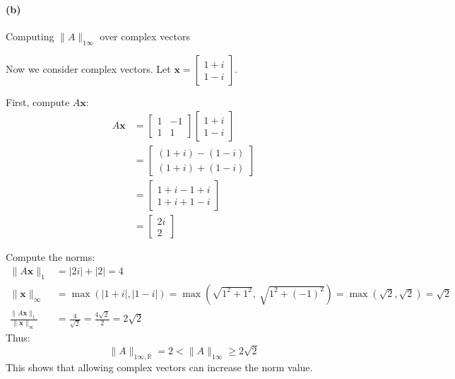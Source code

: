 \paragraph*{(b)} Computing $\|A\|_{1\infty}$ over complex vectors

Now we consider complex vectors. Let $\mathbf{x} = \begin{bmatrix} 1 + i \\ 1 - i \end{bmatrix}$.

First, compute $A\mathbf{x}$:
\begin{align*}
    A\mathbf{x} & = \begin{bmatrix} 1 & -1 \\ 1 & 1 \end{bmatrix} \begin{bmatrix} 1 + i \\ 1 - i \end{bmatrix} \\
                & = \begin{bmatrix} (1 + i) - (1 - i) \\ (1 + i) + (1 - i) \end{bmatrix}                       \\
                & = \begin{bmatrix} 1 + i - 1 + i \\ 1 + i + 1 - i \end{bmatrix}                               \\
                & = \begin{bmatrix} 2i \\ 2 \end{bmatrix}
\end{align*}

Compute the norms:
\begin{align*}
    \|A\mathbf{x}\|_1                               & = |2i| + |2| = 4                                                                                               \\
    \|\mathbf{x}\|_{\infty}                         & = \max(|1 + i|, |1 - i|) = \max(\sqrt{1^2 + 1^2}, \ \sqrt{1^2 + (-1)^2}) = \max(\sqrt{2}, \sqrt{2}) = \sqrt{2} \\
    \frac{\|A\mathbf{x}\|_1}{\|\mathbf{x}\|_\infty} & = \frac{4}{\sqrt{2}} = \frac{4\sqrt{2}}{2} = 2\sqrt{2}
\end{align*}
Thus:
\[
    \|A\|_{1\infty,\mathbb{R}} = 2 < \|A\|_{1\infty} \geq 2\sqrt{2}
\]
This shows that allowing complex vectors can increase the norm value.

